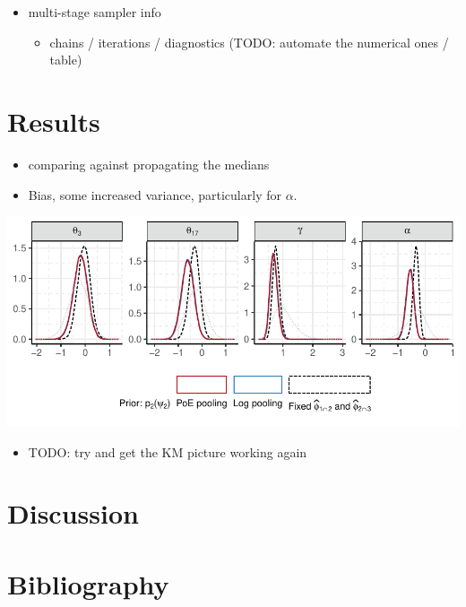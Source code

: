 \documentclass[
  10pt,
  a4paper,
]{article}
\providecommand{\tightlist}{%
  \setlength{\itemsep}{0pt}\setlength{\parskip}{0pt}}
\begin{document}
\begin{itemize}
\tightlist
\item
  multi-stage sampler info

  \begin{itemize}
  \tightlist
  \item
    chains / iterations / diagnostics (TODO: automate the numerical ones
    / table)
  \end{itemize}
\end{itemize}

\hypertarget{results}{%
\section{Results}\label{results}}

\begin{itemize}
\tightlist
\item
  comparing against propagating the medians
\item
  Bias, some increased variance, particularly for \(\alpha\).
\end{itemize}

\begin{center}\includegraphics{../plots/mimic-example/psi-2-method-comparison-small} \end{center}

\begin{itemize}
\tightlist
\item
  TODO: try and get the KM picture working again
\end{itemize}

\hypertarget{discussion}{%
\section{Discussion}\label{discussion}}

\hypertarget{bibliography}{%
\section{Bibliography}\label{bibliography}}
\end{document}
